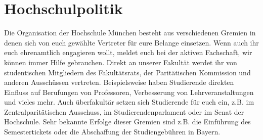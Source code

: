 \section{Hochschulpolitik}
Die Organisation der Hochschule München besteht aus verschiedenen 
Gremien in denen sich von euch gewählte Vertreter für eure Belange 
einsetzen. Wenn auch ihr euch ehrenamtlich engagieren wollt, meldet 
euch bei der aktiven Fachschaft, wir können immer Hilfe gebrauchen. 
Direkt an unserer Fakultät werdet ihr von studentischen Mitgliedern des 
Fakultätsrats, der Paritätischen Kommission und anderen Ausschüssen 
vertreten. Beispielsweise haben Studierende direkten Einfluss  auf 
Berufungen von Professoren, Verbesserung von Lehrveranstaltungen 
und vieles mehr. 
Auch überfakultär setzen sich Studierende für euch ein, z.B. im 
Zentralparitätischen Ausschuss, im Studierendenparlament oder im 
Senat der Hochschule. Sehr bekannte Erfolge dieser Gremien sind 
z.B. die Einführung des Semestertickets oder die Abschaffung  der 
Studiengebühren in Bayern.



